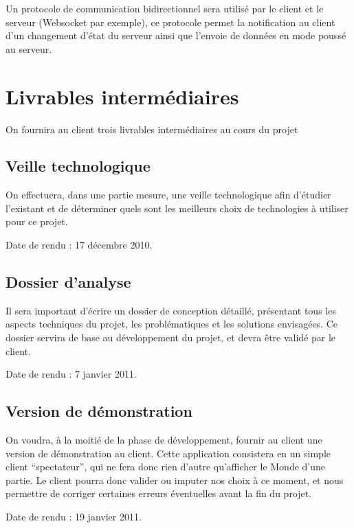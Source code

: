 \documentclass[a4paper,10pt]{report}
\begin{document}
        Un protocole de communication bidirectionnel sera utilisé par le client et le serveur (Websocket par exemple), ce protocole permet la notification au client d’un changement d’état du serveur ainsi que l’envoie de données en mode poussé au serveur.



  \chapter{Livrables intermédiaires}

    On fournira au client trois livrables intermédiaires au cours du projet
    
    \section{Veille technologique}
    
      On effectuera, dans une partie mesure, une veille technologique afin d'étudier l'existant et de déterminer quels sont les meilleurs choix de technologies à utiliser pour ce projet. 
      
      Date de rendu : 17 décembre 2010.
      
    \section{Dossier d'analyse}
    
      Il sera important d'écrire un dossier de conception détaillé, présentant tous les aspects techniques du projet, les problématiques et les solutions envisagées. Ce dossier servira de base au développement du projet, et devra être validé par le client. 
      
      Date de rendu : 7 janvier 2011.
      
    \section{Version de démonstration}
    
      On voudra, à la moitié de la phase de développement, fournir au client une version de démonstration au client. Cette application consistera en un simple client ``spectateur'', qui ne fera donc rien d'autre qu'afficher le Monde d'une partie. Le client pourra donc valider ou imputer nos choix à ce moment, et nous permettre de corriger certaines erreurs éventuelles avant la fin du projet. 
      
      Date de rendu : 19 janvier 2011. 
\end{document}
